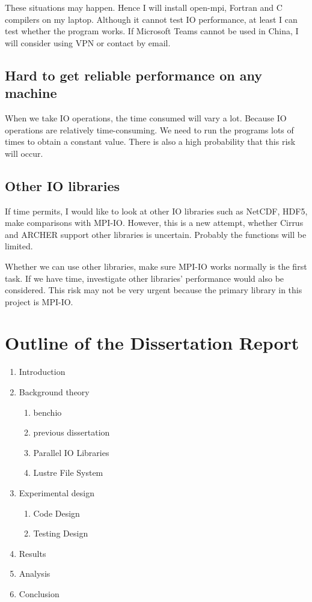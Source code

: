\documentclass{article}
\begin{document}
These situations may happen. Hence I will install open-mpi, Fortran and C compilers on my laptop. Although it cannot test IO performance, at least I can test whether the program works. If Microsoft Teams cannot be used in China, I will consider using VPN or contact by email.

\subsection{Hard to get reliable performance on any machine}
When we take IO operations, the time consumed will vary a lot. Because IO operations are relatively time-consuming. We need to run the programs lots of times to obtain a constant value. There is also a high probability that this risk will occur.

\subsection{Other IO libraries}
If time permits, I would like to look at other IO libraries such as NetCDF, HDF5, make comparisons with MPI-IO. However, this is a new attempt, whether Cirrus and ARCHER support other libraries is uncertain. Probably the functions will be limited.

Whether we can use other libraries, make sure MPI-IO works normally is the first task. If we have time, investigate other libraries' performance would also be considered. This risk may not be very urgent because the primary library in this project is MPI-IO. 

\section{Outline of the Dissertation Report}

\begin{enumerate}
	\item Introduction
	\item Background theory
	\begin{enumerate}
		\item benchio
		\item previous dissertation
		\item Parallel IO Libraries
		\item Lustre File System
	\end{enumerate}
	\item Experimental design
	\begin{enumerate}
		\item Code Design
		\item Testing Design
	\end{enumerate}
	\item Results
	\item Analysis
	\item Conclusion
\end{enumerate}
\end{document}

